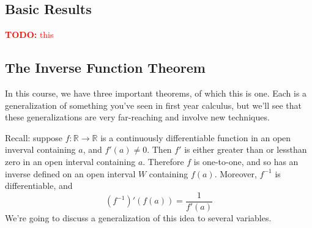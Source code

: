 \documentclass{article}
\newcommand{\reals}[0]{\mathbb{R}}
\newcommand{\TODO}[1]{\textcolor{red}{\textbf{TODO:} #1}}
\begin{document}
\subsection{Basic Results}

\TODO{this}

\subsection{The Inverse Function Theorem}


In this course, we have three important theorems, of which this is one. Each is a generalization of something you've seen in first year calculus, but we'll see that these generalizations are very far-reaching and involve new techniques.

Recall: suppose \(f: \reals \to \reals\) is a continuously differentiable function in an open inverval containing \(a\), and \(f'(a) \neq 0\). Then \(f'\) is either greater than or lessthan zero in an open interval containing \(a\). Therefore \(f\) is one-to-one, and so has an inverse defined on an open interval \(W\) containing \(f(a)\). Moreover, \(f^{-1}\) is differentiable, and
\begin{equation}(f^{-1})'(f(a)) = \frac{1}{f'(a)}\end{equation}
We're going to discuss a generalization of this idea to several variables.
\end{document}
